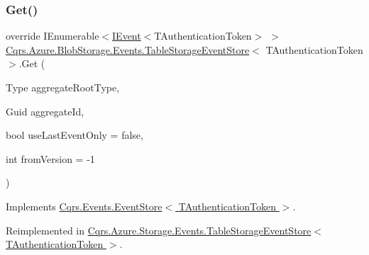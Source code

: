 \subsubsection{\texorpdfstring{Get()}{Get()}\hspace{0.1cm}{\footnotesize\ttfamily [1/2]}}
{\footnotesize\ttfamily override I\+Enumerable$<$\hyperlink{interfaceCqrs_1_1Events_1_1IEvent}{I\+Event}$<$T\+Authentication\+Token$>$ $>$ \hyperlink{classCqrs_1_1Azure_1_1BlobStorage_1_1Events_1_1TableStorageEventStore}{Cqrs.\+Azure.\+Blob\+Storage.\+Events.\+Table\+Storage\+Event\+Store}$<$ T\+Authentication\+Token $>$.Get (\begin{DoxyParamCaption}\item[{Type}]{aggregate\+Root\+Type,  }\item[{Guid}]{aggregate\+Id,  }\item[{bool}]{use\+Last\+Event\+Only = {\ttfamily false},  }\item[{int}]{from\+Version = {\ttfamily -\/1} }\end{DoxyParamCaption})\hspace{0.3cm}{\ttfamily [virtual]}}



Implements \hyperlink{classCqrs_1_1Events_1_1EventStore_aa1d0d399a35c1e3b0759e27202695d8b_aa1d0d399a35c1e3b0759e27202695d8b}{Cqrs.\+Events.\+Event\+Store$<$ T\+Authentication\+Token $>$}.



Reimplemented in \hyperlink{classCqrs_1_1Azure_1_1Storage_1_1Events_1_1TableStorageEventStore_a089514182da7a70f35f9237c521c49f0_a089514182da7a70f35f9237c521c49f0}{Cqrs.\+Azure.\+Storage.\+Events.\+Table\+Storage\+Event\+Store$<$ T\+Authentication\+Token $>$}.

\mbox{\label{classCqrs_1_1Azure_1_1BlobStorage_1_1Events_1_1TableStorageEventStore_a9b952a9257dc6f458b98eba87684412e_a9b952a9257dc6f458b98eba87684412e}} 
